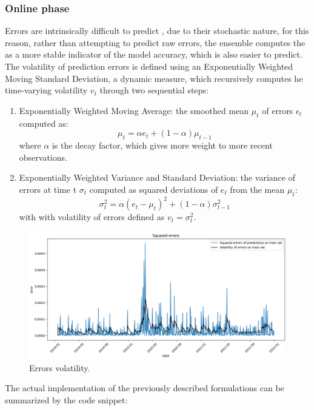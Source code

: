 \subsubsection{Online phase}
Errors are intrinsically difficult to predict , due to their stochastic nature, for this reason, rather than attempting to predict raw errors, the ensemble computes the  as a more stable indicator of the model accuracy, which is also easier to predict. The volatility of prediction errors is defined using an Exponentially Weighted Moving Standard Deviation, a dynamic measure, which recursively computes he time-varying volatility $v_t$ through two sequential steps:
\begin{enumerate}
    \item Exponentially Weighted Moving Average: the  smoothed mean $\mu_t$ of errors $\epsilon_t$ computed as:
    \[
    \mu_t = \alpha e_t + (1 - \alpha) \mu_{t-1}
    \]
    where $\alpha$ is the decay factor, which gives more weight to more recent observations.
    \item Exponentially Weighted Variance and Standard Deviation: the variance of errors at time t $\sigma_t$ computed as squared deviations of $e_t$ from the mean $\mu_t$:
    \[
    \sigma_t^2 = \alpha (e_t - \mu_t)^2 + (1 - \alpha) \sigma_{t-1}^2
    \]
    with with volatility of errors defined as $v_t = \sigma_t^2$.
\end{enumerate}
 \begin{figure}[H]
    \centering
    \includegraphics[width=1\textwidth]{Machine_learning_thesis/Images/error volatility.png}
    \caption{Errors volatility.} 
    \label{fig:Errors volatility}
\end{figure}



The actual implementation of the previously described formulations can be summarized by the code snippet: 

